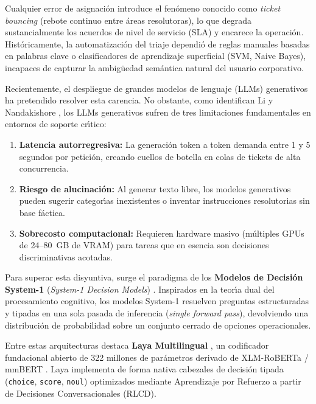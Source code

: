 \documentclass[10pt,journal,compsoc]{IEEEtran}
\begin{document}
Cualquier error de asignaci\'on introduce el fen\'omeno conocido como \emph{ticket bouncing} (rebote continuo entre \'areas resolutoras), lo que degrada sustancialmente los acuerdos de nivel de servicio (SLA) y encarece la operaci\'on. Hist\'oricamente, la automatizaci\'on del triaje dependi\'o de reglas manuales basadas en palabras clave o clasificadores de aprendizaje superficial (SVM, Naive Bayes), incapaces de capturar la ambig\"uedad sem\'antica natural del usuario corporativo.

Recientemente, el despliegue de grandes modelos de lenguaje (LLMs) generativos ha pretendido resolver esta carencia. No obstante, como identifican Li \cite{li2026fast} y Nandakishore \cite{nandakishore2026laya}, los LLMs generativos sufren de tres limitaciones fundamentales en entornos de soporte cr\'{\i}tico:
\begin{enumerate}
    \item \textbf{Latencia autorregresiva:} La generaci\'on token a token demanda entre 1 y 5 segundos por petici\'on, creando cuellos de botella en colas de tickets de alta concurrencia.
    \item \textbf{Riesgo de alucinaci\'on:} Al generar texto libre, los modelos generativos pueden sugerir categor\'{\i}as inexistentes o inventar instrucciones resolutorias sin base f\'actica.
    \item \textbf{Sobrecosto computacional:} Requieren hardware masivo (m\'ultiples GPUs de 24--80~GB de VRAM) para tareas que en esencia son decisiones discriminativas acotadas.
\end{enumerate}

Para superar esta disyuntiva, surge el paradigma de los \textbf{Modelos de Decisi\'on System-1} (\emph{System-1 Decision Models}) \cite{li2026fast, nandakishore2026laya}. Inspirados en la teor\'{\i}a dual del procesamiento cognitivo, los modelos System-1 resuelven preguntas estructuradas y tipadas en una sola pasada de inferencia (\emph{single forward pass}), devolviendo una distribuci\'on de probabilidad sobre un conjunto cerrado de opciones operacionales.

Entre estas arquitecturas destaca \textbf{Laya Multilingual} \cite{convai2026laya}, un codificador fundacional abierto de 322 millones de par\'ametros derivado de XLM-RoBERTa / mmBERT \cite{conneau2020unsupervised, clark2024modernbert}. Laya implementa de forma nativa cabezales de decisi\'on tipada (\texttt{choice}, \texttt{score}, \texttt{noul}) optimizados mediante Aprendizaje por Refuerzo a partir de Decisiones Conversacionales (RLCD).
\end{document}
